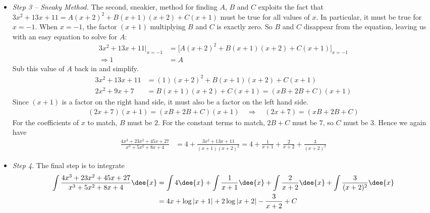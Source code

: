 \begin{eg}
\begin{itemize}
\item \emph{Step 3 -- Sneaky Method.}
The second, sneakier, method for finding $A$, $B$ and $C$ exploits the
fact that $3x^2 + 13x + 11 = A(x+2)^2 + B(x+1)(x+2) + C(x+1)$
must be true for all values of $x$. In particular, it must be true
for $x=-1$. When $x=-1$, the factor $(x+1)$ multiplying $B$ and $C$
is exactly zero. So $B$ and $C$ disappear from the equation,
leaving us with an easy equation to solve for $A$:
\begin{align*}
3x^2+13x+11\Big|_{x=-1}
&=\Big[A(x+2)^2+B(x+1)(x+2) +C(x+1)\Big]_{x=-1} \\[0.1in]
\Longrightarrow 1&=A
\end{align*}
Sub this value of $A$ back in and simplify.
\begin{align*}
3x^2+13x+11&=(1)(x+2)^2+B(x+1)(x+2)+C(x+1)\\[0.05in]
2x^2+9x+7&=B(x+1)(x+2)+C(x+1)=(xB+2B+C)(x+1)
\end{align*}
Since $(x+1)$ is a factor on the right hand side, it must also be a factor
on the left hand side.
\begin{align*}
(2x+7)(x+1)=(xB+2B+C)(x+1)\quad\Rightarrow\quad (2x+7)=(xB+2B+C)
\end{align*}
For the coefficients of $x$ to match, $B$ must be $2$. For the constant
terms to match, $2B+C$ must be $7$, so $C$ must be $3$. Hence we again have
\begin{align*}
\frac{4x^3+23x^2+45x+27}{x^3+5x^2+8x+4}
&= 4+ \frac{3x^2+13x+11}{(x+1)(x+2)^2}
= 4+\frac{1}{x+1}+\frac{2}{x+2}+\frac{3}{(x+2)^2}
\end{align*}
%

\item \emph{Step 4.}
 The final step is to integrate
\begin{align*}
\int\frac{4x^3+23x^2+45x+27}{x^3+5x^2+8x+4}\dee{x}
&=\int 4\dee{x}+\int\frac{1}{x+1}\dee{x}+\int\frac{2}{x+2}\dee{x}+
\int\frac{3}{(x+2)^2}\dee{x}\\
&= 4x+\log|x+1|+2\log|x+2|-\frac{3}{x+2}+C
\end{align*}
\end{itemize}
\end{eg}

